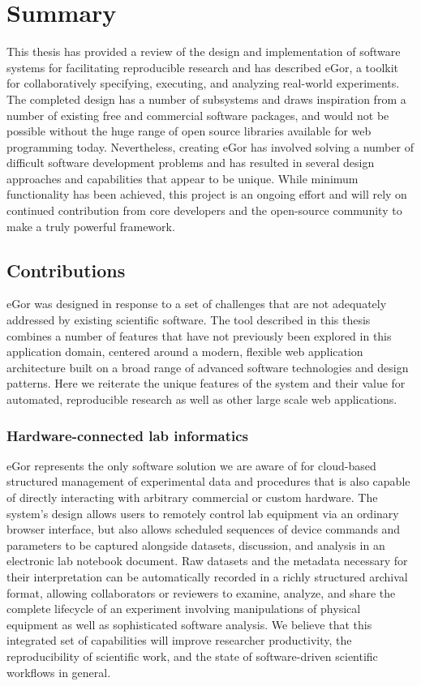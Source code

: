 \documentclass[../thesis]{subfiles}
\begin{document}
\chapter{Summary}
This thesis has provided a review of the design and implementation of
software systems for facilitating reproducible research and has
described eGor, a toolkit for collaboratively specifying, executing,
and analyzing real-world experiments. The completed design has a
number of subsystems and draws inspiration from a number of existing
free and commercial software packages, and would not be possible
without the huge range of open source libraries available for web
programming today. Nevertheless, creating eGor has involved solving a
number of difficult software development problems and has resulted in
several design approaches and capabilities that appear to be
unique. While minimum functionality has been achieved, this project is
an ongoing effort and will rely on continued contribution from core
developers and the open-source community to make a truly powerful
framework.



\section{Contributions}
eGor was designed in response to a set of challenges that are not
adequately addressed by existing scientific software. The tool
described in this thesis combines a number of features that have not
previously been explored in this application domain, centered around a
modern, flexible web application architecture built on a broad range
of advanced software technologies and design patterns. Here we
reiterate the unique features of the system and their value for
automated, reproducible research as well as other large scale web
applications.

\subsection{Hardware-connected lab informatics}
eGor represents the only software solution we are aware of for
cloud-based structured management of experimental data and procedures
that is also capable of directly interacting with arbitrary commercial
or custom hardware. The system's design allows users to remotely
control lab equipment via an ordinary browser interface, but also
allows scheduled sequences of device commands and parameters to be
captured alongside datasets, discussion, and analysis in an electronic
lab notebook document. Raw datasets and the metadata necessary for
their interpretation can be automatically recorded in a richly
structured archival format, allowing collaborators or reviewers to
examine, analyze, and share the complete lifecycle of an experiment
involving manipulations of physical equipment as well as sophisticated
software analysis. We believe that this integrated set of capabilities
will improve researcher productivity, the reproducibility of
scientific work, and the state of software-driven scientific workflows
in general.
\end{document}
